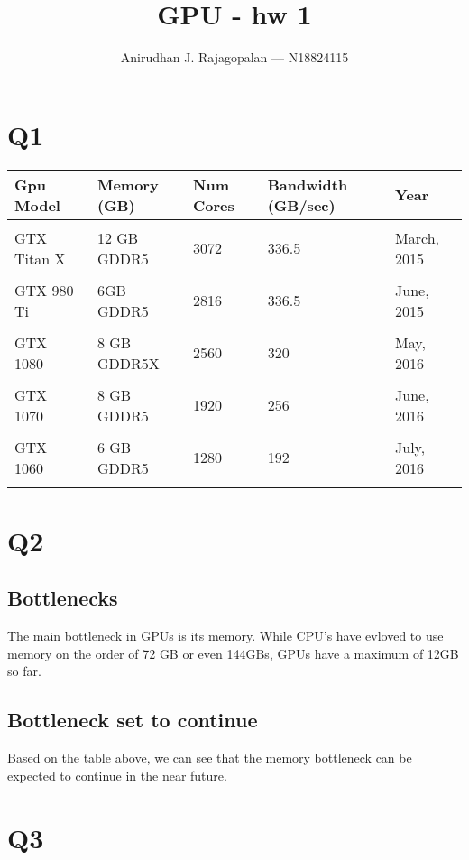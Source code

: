 \documentclass{article}
\begin{document}
\title{GPU - hw 1}
\author{Anirudhan J. Rajagopalan --- N18824115}
\maketitle

\newpage

\section{Q1}

\begin{tabulary}{\textwidth}{LLLLL}
    \bfseries
    Gpu Model & \bfseries Memory (GB) &\bfseries Num Cores &\bfseries Bandwidth (GB/sec) &\bfseries Year \mdseries \\
    \hline \\
    GTX Titan X~\cite{gpu:titan_x} & 12 GB GDDR5 & 3072 & 336.5 & March, 2015 \\\\
    GTX 980 Ti~\cite{gpu:980_ti} & 6GB GDDR5 & 2816 & 336.5 & June, 2015 \\\\
    GTX 1080~\cite{gpu:gtx_1080} &  8 GB GDDR5X & 2560 & 320 & May, 2016    \\\\
    GTX 1070~\cite{gpu:gtx_1070} & 8 GB GDDR5 & 1920 & 256 & June, 2016 \\\\
    GTX 1060~\cite{gpu:gtx_1060} & 6 GB GDDR5 & 1280 & 192 & July, 2016 \\\\
\end{tabulary}

\section{Q2}
\subsection{Bottlenecks}
The main bottleneck in GPUs is its memory.   While CPU's have evloved to use memory on the order of 72 GB or even 144GBs, GPUs have a maximum of 12GB so far.

\subsection{Bottleneck set to continue}
Based on the table above, we can see that the memory bottleneck can be expected to continue in the near future.


\section{Q3}



\end{document}
